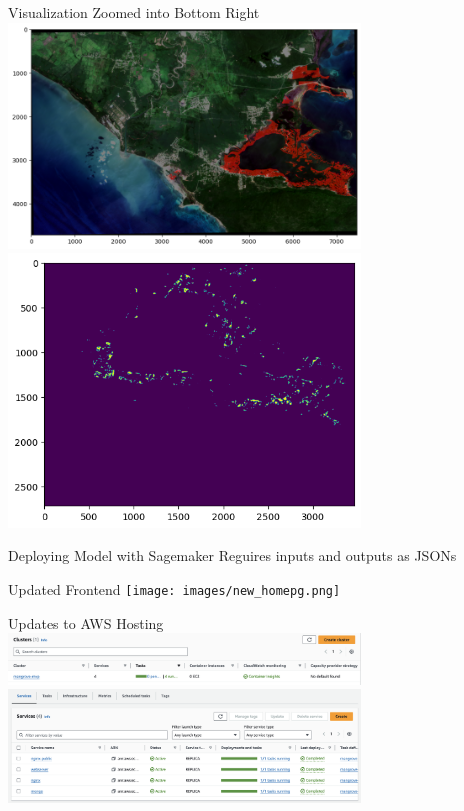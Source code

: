 \begin{frame}{Visualization Zoomed into Bottom Right}
    \centering
    \includegraphics[height=0.7\textheight,width=0.7\textwidth,keepaspectratio]{images/map.png}
    \includegraphics[height=0.7\textheight,width=0.7\textwidth,keepaspectratio]{images/maplabel.png}
\end{frame}

\begin{frame}{Deploying Model with Sagemaker}
    Reguires inputs and outputs as JSONs
\end{frame}

\begin{frame}{Updated Frontend}
    \centering
    \texttt{[image: images/new\_homepg.png]}
\end{frame}

\begin{frame}{Updates to AWS Hosting}
    \centering
    \includegraphics[height=0.7\textheight,width=0.7\textwidth,keepaspectratio]{images/cluster.png}
    \includegraphics[height=0.7\textheight,width=0.7\textwidth,keepaspectratio]{images/services.png}
\end{frame}